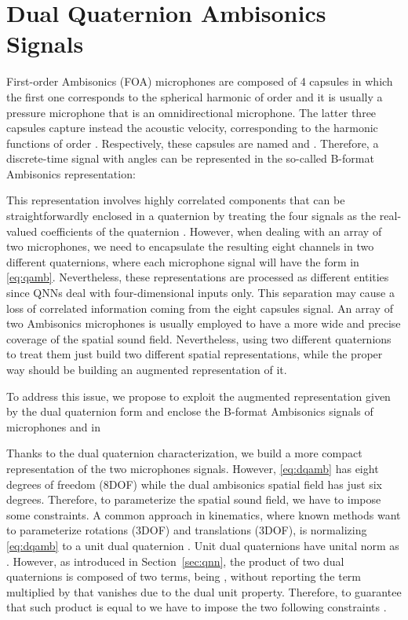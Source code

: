 \documentclass[3p, preprint, twocolumn]{elsarticle}
\begin{document}
\section{Dual Quaternion Ambisonics Signals}
\label{sec:qamb}

First-order Ambisonics (FOA) microphones are composed of 4 capsules in which the first one corresponds to the spherical harmonic of order  and it is usually a pressure microphone that is an omnidirectional microphone. The latter three capsules capture instead the acoustic velocity, corresponding to the harmonic functions of order . Respectively, these capsules are named  and . Therefore, a discrete-time signal  with angles  can be represented in the so-called B-format Ambisonics representation:



This representation involves highly correlated components that can be straightforwardly enclosed in a quaternion by treating the four signals as the real-valued coefficients of the quaternion \cite{ComminielloICASSP2019b, QSSL}. However, when dealing with an array of two microphones, we need to encapsulate the resulting eight channels in two different quaternions, where each microphone signal will have the form in \eqref{eq:qamb}. Nevertheless, these representations are processed as different entities since QNNs deal with four-dimensional inputs only. This separation may cause a loss of correlated information coming from the eight capsules signal. An array of two Ambisonics microphones is usually employed to have a more wide and precise coverage of the spatial sound field. Nevertheless, using two different quaternions to treat them just build two different spatial representations, while the proper way should be building an augmented representation of it.

To address this issue, we propose to exploit the augmented representation given by the dual quaternion form and enclose the B-format Ambisonics signals of microphones  and  in


Thanks to the dual quaternion characterization, we build a more compact representation of the two microphones signals. However, \eqref{eq:dqamb} has eight degrees of freedom (8DOF) while the dual ambisonics spatial field has just six degrees. Therefore, to parameterize the spatial sound field, we have to impose some constraints. A common approach in kinematics, where known methods want to parameterize rotations (3DOF) and translations (3DOF), is normalizing \eqref{eq:dqamb} to a unit dual quaternion \cite{TsiotrasDualQuat2020, Schwung2021RigidBody, Poppelbaum2021DQRigid, Samanc2021TheNS}. Unit dual quaternions have unital norm as . However, as introduced in Section~\ref{sec:qnn}, the product of two dual quaternions is composed of two terms, being , without reporting the term multiplied by  that vanishes due to the dual unit property. Therefore, to guarantee that such product is equal to  we have to impose the two following constraints \cite{CaoDual2021, Valverde2018DynamicMA}.
\end{document}

